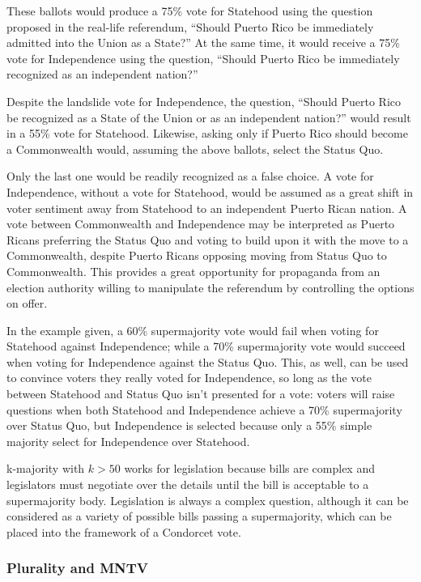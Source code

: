 These ballots would produce a 75\% vote for Statehood using the question proposed in the real-life referendum, ``Should Puerto Rico be immediately admitted into the Union as a State?''  At the same time, it would receive a 75\% vote for Independence using the question, ``Should Puerto Rico be immediately recognized as an independent nation?''

Despite the landslide vote for Independence, the question, ``Should Puerto Rico be recognized as a State of the Union or as an independent nation?'' would result in a 55\% vote for Statehood.  Likewise, asking only if Puerto Rico should become a Commonwealth would, assuming the above ballots, select the Status Quo.

Only the last one would be readily recognized as a false choice.  A vote for Independence, without a vote for Statehood, would be assumed as a great shift in voter sentiment away from Statehood to an independent Puerto Rican nation.  A vote between Commonwealth and Independence may be interpreted as Puerto Ricans preferring the Status Quo and voting to build upon it with the move to a Commonwealth, despite Puerto Ricans opposing moving from Status Quo to Commonwealth.  This provides a great opportunity for propaganda from an election authority willing to manipulate the referendum by controlling the options on offer.

In the example given, a 60\% supermajority vote would fail when voting for Statehood against Independence; while a 70\% supermajority vote would succeed when voting for Independence against the Status Quo.  This, as well, can be used to convince voters they really voted for Independence, so long as the vote between Statehood and Status Quo isn't presented for a vote:  voters will raise questions when both Statehood and Independence achieve a 70\% supermajority over Status Quo, but Independence is selected because only a 55\% simple majority select for Independence over Statehood.

k-majority with $k>50$ works for legislation because bills are complex and legislators must negotiate over the details until the bill is acceptable to a supermajority body.  Legislation is always a complex question, although it can be considered as a variety of possible bills passing a supermajority, which can be placed into the framework of a Condorcet vote.

\subsubsection{Plurality and MNTV}

